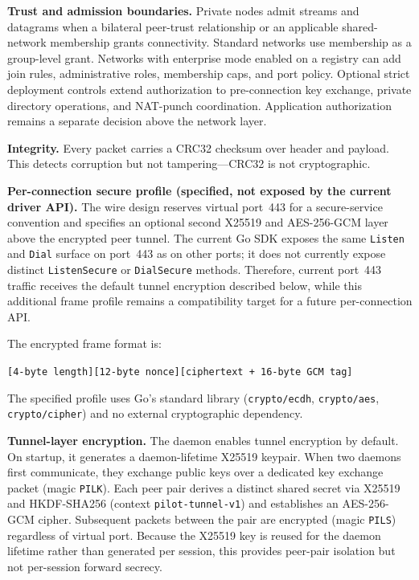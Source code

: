 \documentclass[11pt,a4paper]{article}
\begin{document}
\textbf{Trust and admission boundaries.} Private nodes admit streams and datagrams when a bilateral peer-trust relationship or an applicable shared-network membership grants connectivity. Standard networks use membership as a group-level grant. Networks with enterprise mode enabled on a registry can add join rules, administrative roles, membership caps, and port policy. Optional strict deployment controls extend authorization to pre-connection key exchange, private directory operations, and NAT-punch coordination. Application authorization remains a separate decision above the network layer.

\textbf{Integrity.} Every packet carries a CRC32 checksum over header and payload. This detects corruption but not tampering---CRC32 is not cryptographic.

\textbf{Per-connection secure profile (specified, not exposed by the current driver API).} The wire design reserves virtual port~443 for a secure-service convention and specifies an optional second X25519 and AES-256-GCM layer above the encrypted peer tunnel. The current Go SDK exposes the same \texttt{Listen} and \texttt{Dial} surface on port~443 as on other ports; it does not currently expose distinct \texttt{ListenSecure} or \texttt{DialSecure} methods. Therefore, current port~443 traffic receives the default tunnel encryption described below, while this additional frame profile remains a compatibility target for a future per-connection API.

The encrypted frame format is:

\begin{center}
\texttt{[4-byte length][12-byte nonce][ciphertext + 16-byte GCM tag]}
\end{center}

The specified profile uses Go's standard library (\texttt{crypto/ecdh}, \texttt{crypto/aes}, \texttt{crypto/cipher}) and no external cryptographic dependency.

\textbf{Tunnel-layer encryption.} The daemon enables tunnel encryption by default. On startup, it generates a daemon-lifetime X25519 keypair. When two daemons first communicate, they exchange public keys over a dedicated key exchange packet (magic \texttt{PILK}). Each peer pair derives a distinct shared secret via X25519 and HKDF-SHA256 (context \texttt{pilot-tunnel-v1}) and establishes an AES-256-GCM cipher. Subsequent packets between the pair are encrypted (magic \texttt{PILS}) regardless of virtual port. Because the X25519 key is reused for the daemon lifetime rather than generated per session, this provides peer-pair isolation but not per-session forward secrecy.
\end{document}

